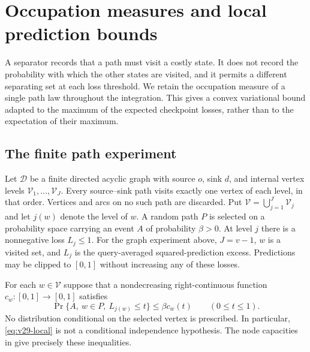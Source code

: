 \section{Occupation measures and local prediction bounds}
\label{sec:v29-occupation}
A separator records that a path must visit a costly state. It does not
record the probability with which the other states are visited, and it
permits a different separating set at each loss threshold. We retain the
occupation measure of a single path law throughout the integration. This
gives a convex variational bound adapted to the maximum of the expected
checkpoint losses, rather than to the expectation of their maximum.

\subsection{The finite path experiment}
Let $\mathscr D$ be a finite directed acyclic graph with source $o$, sink
$d$, and internal vertex levels $\mathscr V_1,\ldots,\mathscr V_J$.
Every source--sink path visits exactly one vertex of each level, in that
order. Vertices and arcs on no such path are discarded. Put
$\mathscr V=\bigcup_{j=1}^J\mathscr V_j$ and let $j(w)$ denote the level
of $w$. A random path $P$ is selected on a probability space carrying an
event $A$ of probability $\beta>0$. At level $j$ there is a nonnegative
loss $L_j\le1$. For the graph experiment above, $J=v-1$, $w$ is a visited
set, and $L_j$ is the query-averaged squared-prediction excess. Predictions
may be clipped to $[0,1]$ without increasing any of these losses.

For each $w\in\mathscr V$ suppose that a nondecreasing right-continuous
function $c_w:[0,1]\to[0,1]$ satisfies
\begin{equation}\label{eq:v29-local}
 \Pr\{A,\ w\in P,\ L_{j(w)}\le t\}\le\beta c_w(t)
                         \qquad(0\le t\le1).
\end{equation}
No distribution conditional on the selected vertex is prescribed. In
particular, \eqref{eq:v29-local} is not a conditional independence
hypothesis. The node capacities in
 give precisely these inequalities.

